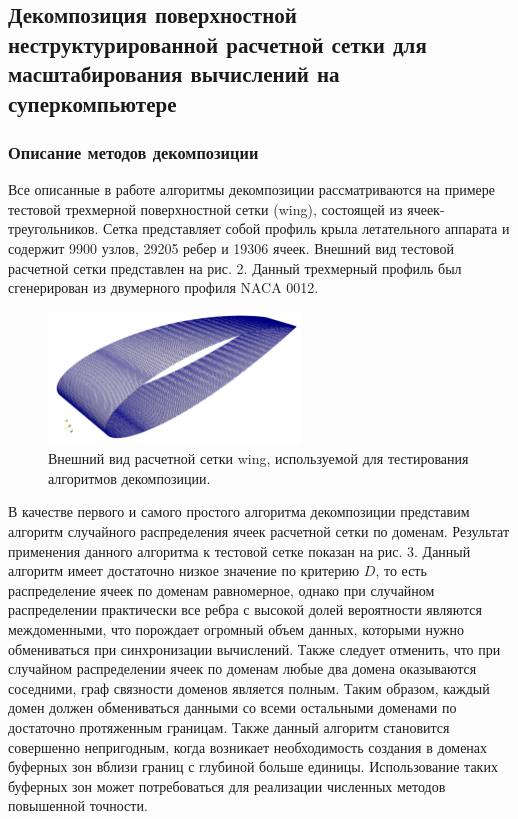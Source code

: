 \subsection{Декомпозиция поверхностной неструктурированной расчетной сетки для масштабирования вычислений на суперкомпьютере}

\subsubsection{Описание методов декомпозиции}

Все описанные в работе алгоритмы декомпозиции рассматриваются на примере тестовой трехмерной поверхностной сетки (wing), состоящей из ячеек-треугольников.
Сетка представляет собой профиль крыла летательного аппарата и содержит 9900 узлов, 29205 ребер и 19306 ячеек.
Внешний вид тестовой расчетной сетки представлен на рис. 2.
Данный трехмерный профиль был сгенерирован из двумерного профиля NACA 0012.

\begin{figure}[ht]
	\centering
		\includegraphics[width=0.6\textwidth]{./pics/text_2_decompsurf/wing_grid.png}
	\caption{Внешний вид расчетной сетки wing, используемой для тестирования алгоритмов декомпозиции.}
	\label{fig:text_2_decompsurf_wing_grid}
\end{figure}

В качестве первого и самого простого алгоритма декомпозиции представим алгоритм случайного распределения ячеек расчетной сетки по доменам.
Результат применения данного алгоритма к тестовой сетке показан на рис. 3.
Данный алгоритм имеет достаточно низкое значение по критерию $D$, то есть распределение ячеек по доменам равномерное, однако при случайном распределении практически все ребра с высокой долей вероятности являются междоменными, что порождает огромный объем данных, которыми нужно обмениваться при синхронизации вычислений.
Также следует отменить, что при случайном распределении ячеек по доменам любые два домена оказываются соседними, граф связности доменов является полным.
Таким образом, каждый домен должен обмениваться данными со всеми остальными доменами по достаточно протяженным границам.
Также данный алгоритм становится совершенно непригодным, когда возникает необходимость создания в доменах буферных зон вблизи границ с глубиной больше единицы.
Использование таких буферных зон может потребоваться для реализации численных методов повышенной точности.

